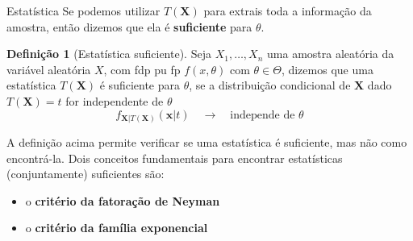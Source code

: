 \documentclass[10pt]{beamer}\usepackage[]{graphicx}\usepackage[]{color}
\newcommand{\mb}[1]{\mathbf{#1}}
\theoremstyle{definition}
\newtheorem*{mydef}{Definição}
\begin{document}
\begin{frame}{Estatística}
  Se podemos utilizar $T(\mb{X})$ para extrais toda a informação da
  amostra, então dizemos que ela é \textbf{suficiente} para
  $\theta$.
  \begin{mydef}[Estatística suficiente]
    Seja $X_1, \ldots, X_n$ uma amostra aleatória da variável aleatória
    $X$, com fdp pu fp $f(x,\theta)$ com $\theta \in \Theta$, dizemos
    que uma estatística $T(\mb{X})$ é suficiente para $\theta$, se a
    distribuição condicional de $\mb{X}$ dado $T(\mb{X}) = t$ for
    independente de $\theta$
    \begin{equation*}
      f_{\mb{X}|T(\mb{X})} (\mb{x} | t) \quad \rightarrow \quad
      \text{independe de } \theta
    \end{equation*}
  \end{mydef}
  A definição acima permite verificar se uma estatística é suficiente,
  mas não como encontrá-la. Dois conceitos fundamentais para encontrar
  estatísticas (conjuntamente) suficientes são:
  \begin{itemize}
  \item o \textbf{critério da fatoração de Neyman}
  \item o \textbf{critério da família exponencial}
  \end{itemize}
\end{frame}

\end{document}
